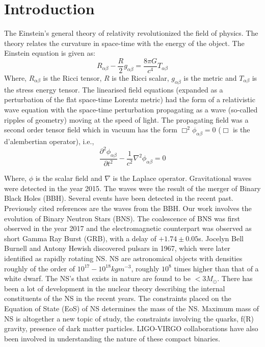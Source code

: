 \documentclass[preprint,12pt]{elsarticle}
\begin{document}

\section{Introduction}
\label{S:1}
The Einstein's general theory of relativity revolutionized the field of physics\citep{Einstein:1916}. The theory relates the curvature in space-time with the energy of the object. The Einstein equation is given as:
\begin{equation}
R_{\alpha\beta}-\frac{R}{2}g_{\alpha\beta} = \frac{8\pi G}{c^4}T_{\alpha\beta}    
\end{equation}
Where, $R_{\alpha\beta}$ is the Ricci tensor, $R$ is the Ricci scalar, $g_{\alpha\beta}$ is the metric and $T_{\alpha\beta}$ is the stress energy tensor. The linearised field equations (expanded as a perturbation of the flat space-time Lorentz metric) had the form of a relativistic wave equation with the space-time perturbation propagating as a wave (so-called ripples of geometry) moving at the speed of light. The propagating field was a second order tensor field which in vacuum has the form $\Box^2 \phi_{\alpha \beta}=0$\citep{Einstein:1918} ($\Box$ is the d'alembertian operator), i.e.,
\begin{equation}
\frac{\partial^2 \phi_{\alpha \beta}}{\partial t^2}-\frac{1}{c^2}\nabla^2\phi_{\alpha \beta} = 0
\end{equation}

Where, $\phi$ is the scalar field and $\nabla$ is the Laplace operator. Gravitational waves were detected in the year 2015\citep{Abbott:2016}. The waves were the result of the merger of Binary Black Holes (BBH). Several events have been detected in the recent past\citep{Abbott:2017, Abbott:2017b, Abbott:2017c}. Previously cited references are the waves from the BBH. Our work involves the evolution of Binary Neutron Stars (BNS). The coalescence of BNS was first observed in the year 2017\citep{Abbott:2017d} and the electromagnetic counterpart was observed as short Gamma Ray Burst (GRB), with a delay of $+ 1.74 \pm 0.05$s\citep{Abbott:2017e, Goldstein:2017}. Jocelyn Bell Burnell and Antony Hewish discovered pulsars in 1967\citep{Hewish:1968}, which were later identified as rapidly rotating NS. NS are astronomical objects with densities roughly of the order of $10^{17}-10^{18} kg m^{-3}$\citep{Hartle:1977, Goldman:1989}, roughly $10^8$ times higher than that of a white dwarf. The NS's that exists in nature are found to be $<3M_{\odot}$. There has been a lot of development in the nuclear theory describing the internal constituents of the NS in the recent years. The constraints placed on the Equation of State (EoS) of NS determines the mass of the NS. Maximum mass of NS is altogether a new topic of study, the constraints involving the quarks\citep{Weber:2006}, f(R) gravity\citep{Capozziello:2016}, presence of dark matter particles\citep{KUMAR:2020}. LIGO-VIRGO collaborations have also been involved in understanding the nature of these compact binaries.\\
\end{document}

